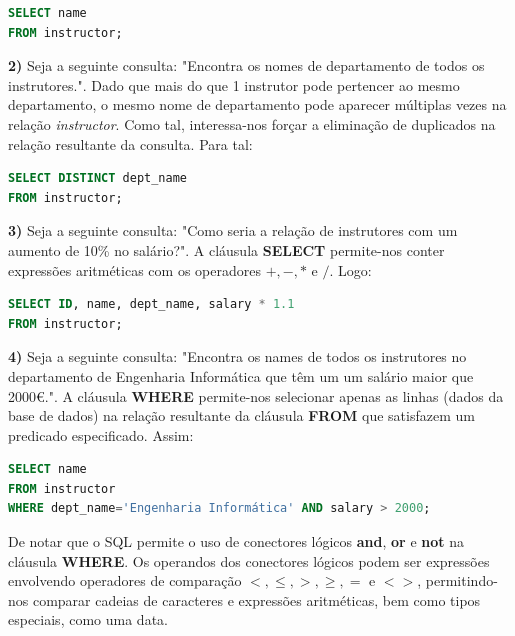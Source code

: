 \documentclass[oneside]{book}
\theoremstyle{definition}
\begin{document}
\begin{lstlisting}[language=SQL, morekeywords={REFERENCES, REFRESH, MATERIALIZED, CONCURRENTLY}, framesep=8pt, xleftmargin=40pt, framexleftmargin=40pt, frame=tb, framerule=0pt]
SELECT name
FROM instructor;
\end{lstlisting} 
\textbf{2)} Seja a seguinte consulta: "Encontra os nomes de departamento de todos os instrutores.". Dado que mais do que 1 instrutor pode pertencer ao mesmo departamento, o mesmo nome de departamento pode aparecer múltiplas vezes na relação \textit{instructor}. Como tal, interessa-nos forçar a eliminação de duplicados na relação resultante da consulta. Para tal:

\begin{lstlisting}[language=SQL, morekeywords={REFERENCES, REFRESH, MATERIALIZED, CONCURRENTLY}, framesep=8pt, xleftmargin=40pt, framexleftmargin=40pt, frame=tb, framerule=0pt]
SELECT DISTINCT dept_name
FROM instructor;
\end{lstlisting}
\textbf{3)} Seja a seguinte consulta: "Como seria a relação de instrutores com um aumento de 10\% no salário?". A cláusula \textbf{SELECT} permite-nos conter expressões aritméticas com os operadores $+, -, *$ e $/$. Logo:

\begin{lstlisting}[language=SQL, morekeywords={REFERENCES, REFRESH, MATERIALIZED, CONCURRENTLY}, framesep=8pt, xleftmargin=40pt, framexleftmargin=40pt, frame=tb, framerule=0pt]
SELECT ID, name, dept_name, salary * 1.1
FROM instructor;
\end{lstlisting}
\textbf{4)} Seja a seguinte consulta: "Encontra os names de todos os instrutores no departamento de Engenharia Informática que têm um um salário maior que 2000€.". A cláusula \textbf{WHERE} permite-nos selecionar apenas as linhas (dados da base de dados) na relação resultante da cláusula \textbf{FROM} que satisfazem um predicado especificado. Assim:

\begin{lstlisting}[language=SQL, morekeywords={REFERENCES, REFRESH, MATERIALIZED, CONCURRENTLY}, framesep=8pt, xleftmargin=40pt, framexleftmargin=40pt, frame=tb, framerule=0pt]
SELECT name
FROM instructor
WHERE dept_name='Engenharia Informática' AND salary > 2000;
\end{lstlisting}
De notar que o SQL permite o uso de conectores lógicos \textbf{and}, \textbf{or} e \textbf{not} na cláusula \textbf{WHERE}. Os operandos dos conectores lógicos podem ser expressões envolvendo operadores de comparação $<, \leq, >, \geq, =$ e $<>$, permitindo-nos comparar cadeias de caracteres e expressões aritméticas, bem como tipos especiais, como uma data.
\end{document}
